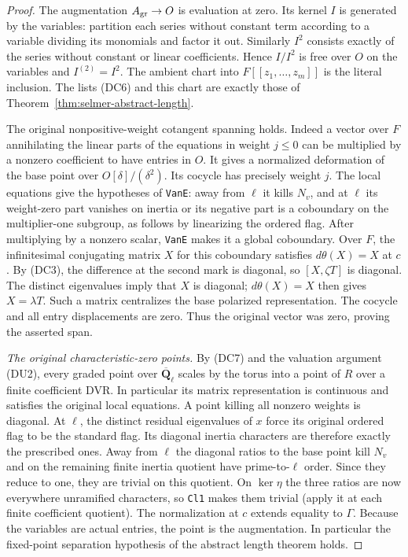 \begin{proof}
The augmentation $A_{\rm gr}\to O$ is evaluation at zero. Its
kernel $I$ is generated by the variables: partition each series
without constant term according to a variable dividing its monomials
and factor it out. Similarly $I^2$ consists exactly of the series
without constant or linear coefficients. Hence $I/I^2$ is free
over $O$ on the variables and $I^{(2)}=I^2$.
The ambient chart into $F[[z_1,\ldots,z_m]]$ is the literal inclusion.
The lists (DC6) and this chart are exactly those of
Theorem~\ref{thm:selmer-abstract-length}.

The original nonpositive-weight cotangent spanning holds.
Indeed a vector over $F$ annihilating the linear parts of the
equations in weight $j\le0$ can be multiplied by a nonzero
coefficient to have entries in $O$. It gives a normalized
deformation of the base point over $O[\delta]/(\delta^2)$.
Its cocycle has precisely weight $j$. The local equations give
the hypotheses of \texttt{VanE}: away from $\ell$ it kills
$N_v$, and at $\ell$ its weight-zero part vanishes on inertia
or its negative part is a coboundary on the multiplier-one
subgroup, as follows by linearizing the ordered flag.
After multiplying by a nonzero scalar, \texttt{VanE} makes it a
global coboundary. Over $F$, the infinitesimal conjugating matrix
$X$ for this coboundary satisfies $d\theta(X)=X$ at $c$.
By (DC3), the difference at the second mark is diagonal, so
$[X,\zeta T]$ is diagonal. The distinct eigenvalues imply
that $X$ is diagonal; $d\theta(X)=X$ then gives $X=\lambda T$.
Such a matrix centralizes the base polarized representation.
The cocycle and all entry displacements are zero.
Thus the original vector was zero, proving the asserted span.

\emph{The original characteristic-zero points.}
By (DC7) and the valuation argument (DU2), every graded point
over $\overline{\mathbf Q}_\ell$ scales by the torus into a
point of $R$ over a finite coefficient DVR. In particular its
matrix representation is continuous and satisfies the original
local equations. A point killing all nonzero weights is
diagonal. At $\ell$, the distinct residual eigenvalues of $x$
force its original ordered flag to be the standard flag. Its
diagonal inertia characters are therefore exactly the
prescribed ones. Away from $\ell$ the diagonal ratios to the
base point kill $N_v$ and on the remaining finite inertia
quotient have prime-to-$\ell$ order. Since they reduce to one,
they are trivial on this quotient. On $\ker\eta$ the three
ratios are now everywhere unramified characters, so \texttt{Cl1}
makes them trivial (apply it at each finite coefficient quotient).
The normalization at $c$ extends equality to $\Gamma$.
Because the variables are actual entries, the point is the
augmentation. In particular the fixed-point separation
hypothesis of the abstract length theorem holds.


\end{proof}
